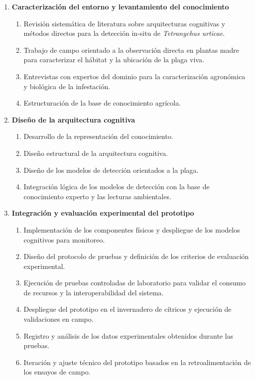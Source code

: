 \documentclass[12pt,letterpaper]{article}
\begin{document}
\begin{enumerate}[label=\textbf{WP\arabic*.}, leftmargin=*]
\item \textbf{Caracterización del entorno y levantamiento del conocimiento}
\begin{enumerate}[label=1.\arabic*.]
    \item Revisión sistemática de literatura sobre arquitecturas cognitivas y métodos directos para la detección in-situ de \textit{Tetranychus urticae}.
    \item Trabajo de campo orientado a la observación directa en plantas madre para caracterizar el hábitat y la ubicación de la plaga viva.
    \item Entrevistas con expertos del dominio para la caracterización agronómica y biológica de la infestación.
    \item Estructuración de la base de conocimiento agrícola.
\end{enumerate}

\item \textbf{Diseño de la arquitectura cognitiva}
\begin{enumerate}[label=2.\arabic*.]
    \item Desarrollo de la representación del conocimiento.
    \item Diseño estructural de la arquitectura cognitiva.
    \item Diseño de los modelos de detección orientados a la plaga.
    \item Integración lógica de los modelos de detección con la base de conocimiento experto y las lecturas ambientales.
\end{enumerate}

\item \textbf{Integración y evaluación experimental del prototipo}
\begin{enumerate}[label=3.\arabic*.]
    \item Implementación de los componentes físicos y despliegue de los modelos cognitivos para monitoreo.
    \item Diseño del protocolo de pruebas y definición de los criterios de evaluación experimental.
    \item Ejecución de pruebas controladas de laboratorio para validar el consumo de recursos y la interoperabilidad del sistema.
    \item Despliegue del prototipo en el invernadero de cítricos y ejecución de validaciones en campo.
    \item Registro y análisis de los datos experimentales obtenidos durante las pruebas.
    \item Iteración y ajuste técnico del prototipo basados en la retroalimentación de los ensayos de campo.
\end{enumerate}


\end{enumerate}
\end{document}

